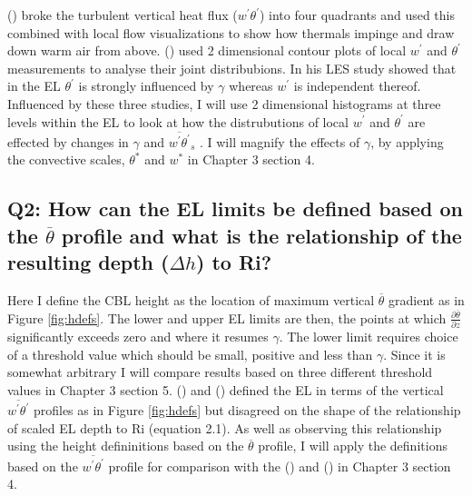 \citeauthor{SullMoengStev} (\citeyear{SullMoengStev}) broke the turbulent vertical heat flux ($w^{'}\theta^{'}$) into four quadrants and used this combined with local flow visualizations to show how thermals impinge and draw down warm air from above. \citeauthor{MahrtPaum} (\citeyear{MahrtPaum}) used 2 dimensional contour plots of local $w^{'}$ and $\theta^{'}$ measurements to analyse their joint distribubions.  In his \citeyear{Sorbjan} \acs{LES} study \citeauthor{Sorbjan} showed that in the \acs{EL} $\theta^{'}$ is strongly influenced by $\gamma$  whereas $w^{'}$ is independent thereof.  Influenced by these three studies, I will use 2 dimensional histograms at three levels within the \acs{EL} to look at how the distrubutions of local $w^{'}$ and $\theta^{'}$ are effected by changes in $\gamma$ and $\overline{w^{'}\theta^{'}}_{s}$ .  I will magnify the effects of $\gamma$, by applying the convective scales, $\theta^{*}$ and $w^{*}$ in Chapter 3 section 4.\\    

\subsection{Q2: How can the \acs{EL} limits be defined based on the $\overline{\theta}$ profile and what is the relationship of the resulting depth ($\Delta h$) to \acs{Ri}?}
       
Here I define the \acs{CBL} height as the location of maximum vertical $\overline{\theta}$ gradient as in Figure \ref{fig:hdefs}.  The lower and upper \acs{EL} limits are then, the points at which $\frac{\partial \overline{\theta}}{\partial z}$ significantly exceeds zero and where it resumes $\gamma$.  The lower limit requires choice of a threshold value which should be small, positive and less than $\gamma$. Since it is somewhat arbitrary I will compare results based on three different threshold values in Chapter 3 section 5.  \citeauthor{FedConzMir04} (\citeyear{FedConzMir04}) and \citeauthor{BrooksFowler2} (\citeyear{BrooksFowler2}) defined the \acs{EL} in terms of the vertical $\overline{w^{'}\theta^{'}}$ profiles as in Figure \ref{fig:hdefs} but disagreed on the shape of the relationship of scaled \acs{EL} depth to \acs{Ri} (equation 2.1).  As well as observing this relationship using the height defininitions based on the $\overline{\theta}$ profile, I will apply the definitions based on the $\overline{w^{'}\theta^{'}}$ profile for comparison with the \citeauthor{BrooksFowler2} (\citeyear{BrooksFowler2}) and \citeauthor{FedConzMir04} (\citeyear{FedConzMir04}) in Chapter 3 section 4.\\  

